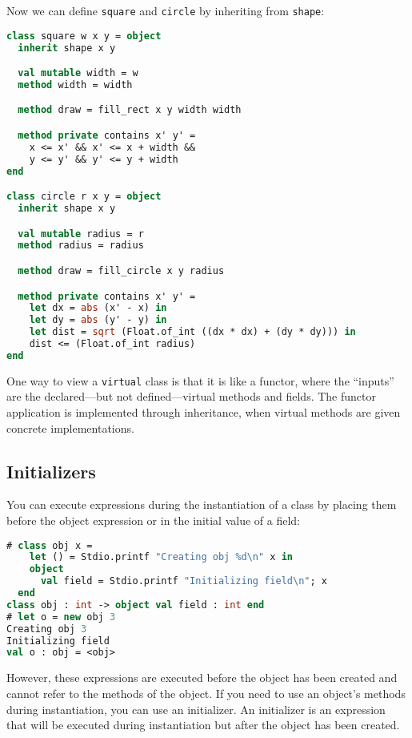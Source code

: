 Now we can define \passthrough{\lstinline!square!} and
\passthrough{\lstinline!circle!} by inheriting from
\passthrough{\lstinline!shape!}:

\begin{lstlisting}[language=Caml]
class square w x y = object
  inherit shape x y

  val mutable width = w
  method width = width

  method draw = fill_rect x y width width

  method private contains x' y' =
    x <= x' && x' <= x + width &&
    y <= y' && y' <= y + width
end

class circle r x y = object
  inherit shape x y

  val mutable radius = r
  method radius = radius

  method draw = fill_circle x y radius

  method private contains x' y' =
    let dx = abs (x' - x) in
    let dy = abs (y' - y) in
    let dist = sqrt (Float.of_int ((dx * dx) + (dy * dy))) in
    dist <= (Float.of_int radius)
end
\end{lstlisting}

One way to view a \passthrough{\lstinline!virtual!} class is that it is
like a functor, where the ``inputs'' are the declared---but not
defined---virtual methods and fields. The functor application is
implemented through inheritance, when virtual methods are given concrete
implementations.

\hypertarget{initializers}{%
\subsection{Initializers}\label{initializers}}

You can execute expressions during the instantiation of a class by
placing them before the object expression or in the initial value of a
field: 

\begin{lstlisting}[language=Caml]
# class obj x =
    let () = Stdio.printf "Creating obj %d\n" x in
    object
      val field = Stdio.printf "Initializing field\n"; x
  end
class obj : int -> object val field : int end
# let o = new obj 3
Creating obj 3
Initializing field
val o : obj = <obj>
\end{lstlisting}

However, these expressions are executed before the object has been
created and cannot refer to the methods of the object. If you need to
use an object's methods during instantiation, you can use an
initializer. An initializer is an expression that will be executed
during instantiation but after the object has been created.

